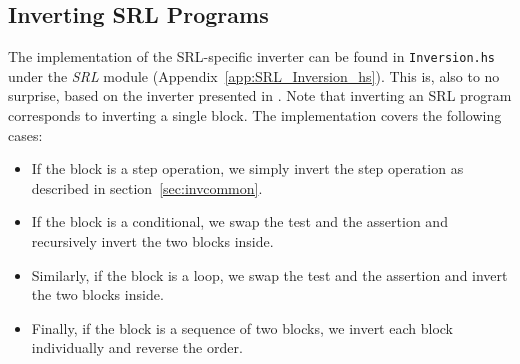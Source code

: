 \subsection{Inverting SRL Programs}

The implementation of the SRL-specific inverter can be found in \texttt{Inversion.hs} under the \textit{SRL} module (Appendix~\ref{app:SRL_Inversion_hs}). This is, also to no surprise, based on the inverter presented in \cite[Fig.~18]{REV}. Note that inverting an SRL program corresponds to inverting a single block. The implementation covers the following cases:

\begin{itemize}
  \item If the block is a step operation, we simply invert the step operation as described in section~\ref{sec:invcommon}.

  \item If the block is a conditional, we swap the test and the assertion and recursively invert the two blocks inside.

  \item Similarly, if the block is a loop, we swap the test and the assertion and invert the two blocks inside.

  \item Finally, if the block is a sequence of two blocks, we invert each block individually and reverse the order.
\end{itemize}
